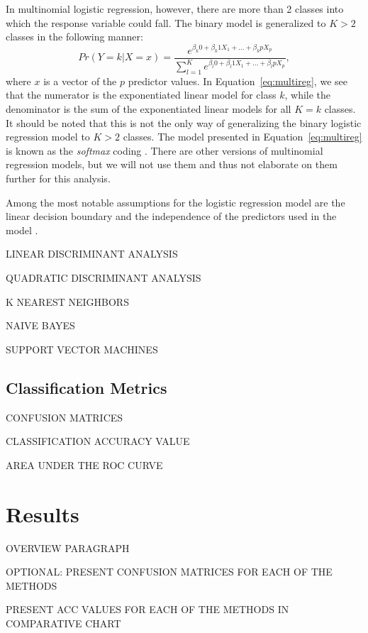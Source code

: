 \documentclass[12pt]{article}
\begin{document}
 In multinomial logistic regression, however, there are more than 2 classes 
 into which the response variable could fall.  The binary model is generalized 
 to $K > 2$ classes in the following manner:
 \begin{equation}
  \label{eq:multireg}
  Pr( Y = k | X = x ) = 
  \frac{e ^ {\beta_k0 + \beta_k1X_1 + ... + \beta_kpX_p}}
  { \sum_{l = 1} ^ {K}  e ^ {\beta_l0 + \beta_l1X_1 + ... + \beta_lpX_p}},
\end{equation}
where $x$ is a vector of the $p$ predictor values.  In 
Equation~\eqref{eq:multireg}, we see that the numerator is the exponentiated 
linear model for class $k$, while the denominator is the sum of the 
exponentiated linear models for all $K = k$ classes.  It should be noted 
that this is not the only way of generalizing the binary logistic regression 
model to $K >2$ classes.  The model presented in Equation~\eqref{eq:multireg} 
is known as the \textit{softmax} coding \citep{james2021introduction}.  
There are other versions of multinomial regression models, but we will not 
use them and thus not elaborate on them further for this analysis.  

Among the most notable assumptions for the logistic regression model are 
the linear decision boundary and the independence of the predictors used 
in the model \citep{khan2023comparison}.

LINEAR DISCRIMINANT ANALYSIS

QUADRATIC DISCRIMINANT ANALYSIS 

K NEAREST NEIGHBORS

NAIVE BAYES

SUPPORT VECTOR MACHINES

\subsection{Classification Metrics}
\label{sec:metr}

CONFUSION MATRICES

CLASSIFICATION ACCURACY VALUE

AREA UNDER THE ROC CURVE

\section{Results}
\label{sec:resu}

OVERVIEW PARAGRAPH

OPTIONAL: PRESENT CONFUSION MATRICES FOR EACH OF THE METHODS

PRESENT ACC VALUES FOR EACH OF THE METHODS IN COMPARATIVE CHART
\end{document}
